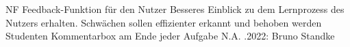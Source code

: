 \begin{myreq}
    \threeinline
    {\reqno \currfilebase}
    {\reqtype NF}
    {}
    \reqdesc Feedback-Funktion für den Nutzer
    \reqrat Besseres Einblick zu dem Lernprozess des Nutzers erhalten. Schwächen sollen effizienter erkannt und behoben werden
    \reqorig Studenten
    \reqfit Kommentarbox am Ende jeder Aufgabe  %
    \twoinline
    {}
    {}
    \twoinline
    {}
    {\reqconf N.A.}
    \reqmater {}
    .2022: Bruno Standke
\end{myreq}
